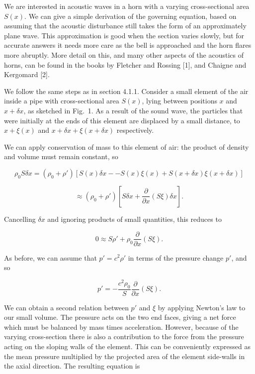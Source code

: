   We are interested in acoustic waves in a horn with a varying cross-sectional 
  area $S(x)$. We can give a simple derivation of the governing equation, based 
  on assuming that the acoustic disturbance still takes the form of an 
  approximately plane wave. This approximation is good when the section varies 
  slowly, but for accurate answers it needs more care as the bell is approached 
  and the horn flares more abruptly. More detail on this, and many other 
  aspects of the acoustics of horns, can be found in the books by Fletcher and 
  Rossing [1], and Chaigne and Kergomard [2]. 

  We follow the same steps as in section 4.1.1. Consider a small element of the 
  air inside a pipe with cross-sectional area $S(x)$, lying between positions 
  $x$ and $x+\delta x$, as sketched in Fig.\ 1. As a result of the sound wave, 
  the particles that were initially at the ends of this element are displaced 
  by a small distance, to $x+\xi(x)$ and $x + \delta x + \xi(x + \delta x)$ 
  respectively. 


  We can apply conservation of mass to this element of air: the product of 
  density and volume must remain constant, so 

  $$\rho_0 S \delta x = (\rho_0 + \rho') \left[ S(x) \delta x -- S(x) \xi(x) 
  +S(x+ \delta x) \xi(x+ \delta x) \right] $$ 

  $$\approx (\rho_0 + \rho') \left[ S \delta x + \frac{\partial}{\partial x} 
  \left(S \xi \right) \delta x \right] . \tag{1}$$ 

  Cancelling $\delta x$ and ignoring products of small quantities, this reduces 
  to 

  $$0 \approx S \rho' + \rho_0 \frac{\partial}{\partial x} \left(S \xi \right) 
  . \tag{2}$$ 

  As before, we can assume that $p' = c^2 \rho'$ in terms of the pressure 
  change $p'$, and so 

  $$p' = -\dfrac{c^2 \rho_0}{S}\frac{\partial}{\partial x} \left(S \xi \right) 
  . \tag{3}$$ 

  We can obtain a second relation between $p'$ and $\xi$ by applying Newton's 
  law to our small volume. The pressure acts on the two end faces, giving a net 
  force which must be balanced by mass times acceleration. However, because of 
  the varying cross-section there is also a contribution to the force from the 
  pressure acting on the sloping walls of the element. This can be conveniently 
  expressed as the mean pressure multiplied by the projected area of the 
  element side-walls in the axial direction. The resulting equation is 

